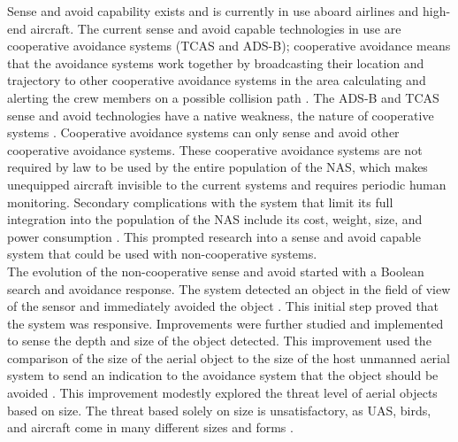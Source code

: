 \indent Sense and avoid capability exists and is currently in use aboard airlines and high-end aircraft. The current sense and avoid capable technologies in use are cooperative avoidance systems (TCAS and ADS-B); cooperative avoidance means that the avoidance systems work together by broadcasting their location and trajectory to other cooperative avoidance systems in the area calculating and alerting the crew members on a possible collision path \cite{[8],[9]}. The ADS-B and TCAS sense and avoid technologies have a native weakness, the nature of cooperative systems \cite{[8],[15],[16]}. Cooperative avoidance systems can only sense and avoid other cooperative avoidance systems. These cooperative avoidance systems are not required by law to be used by the entire population of the NAS, which makes unequipped aircraft invisible to the current systems and requires periodic human monitoring. Secondary complications with the system that limit its full integration into the population of the NAS include its cost, weight, size, and power consumption \cite{[8],[14],[15],[16]}. This prompted research into a sense and avoid capable system that could be used with non-cooperative systems.\\ 
\indent The evolution of the non-cooperative sense and avoid started with a Boolean search and avoidance response. The system detected an object in the field of view of the sensor and immediately avoided the object \cite{[9],[10],[11]}. This initial step proved that the system was responsive. Improvements were further studied and implemented to sense the depth and size of the object detected. This improvement used the comparison of the size of the aerial object to the size of the host unmanned aerial system to send an indication to the avoidance system that the object should be avoided \cite{[9],[10]}. This improvement modestly explored the threat level of aerial objects based on size. The threat based solely on size is unsatisfactory, as UAS, birds, and aircraft come in many different sizes and forms \cite{[17]}.\\ 

